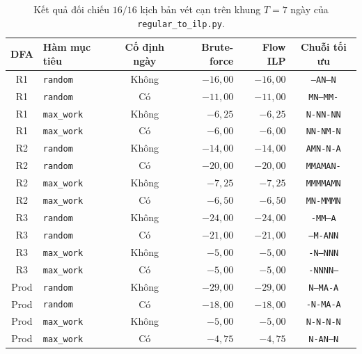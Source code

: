\begin{table}[htbp]
\centering
\caption{Kết quả đối chiếu $16/16$ kịch bản vét cạn trên khung $T=7$ ngày của \texttt{regular\_to\_ilp.py}.}
\label{tab:app_bf}
\footnotesize
\setlength{\tabcolsep}{6pt}
\renewcommand{\arraystretch}{1.16}
\begin{tabularx}{\textwidth}{@{} c L c r r c @{}}
\toprule
\textbf{DFA} & \textbf{Hàm mục tiêu} & \textbf{Cố định ngày} & \textbf{Brute-force} & \textbf{Flow ILP} & \textbf{Chuỗi tối ưu} \\
\midrule
R1 & \texttt{random}    & Không & $-16{,}00$ & $-16{,}00$ & \texttt{--AN--N} \\
R1 & \texttt{random}    & Có    & $-11{,}00$ & $-11{,}00$ & \texttt{MN--MM-} \\
R1 & \texttt{max\_work} & Không & $-6{,}25$  & $-6{,}25$  & \texttt{N-NN-NN} \\
R1 & \texttt{max\_work} & Có    & $-6{,}00$  & $-6{,}00$  & \texttt{NN-NM-N} \\
\addlinespace[3pt]
R2 & \texttt{random}    & Không & $-14{,}00$ & $-14{,}00$ & \texttt{AMN-N-A} \\
R2 & \texttt{random}    & Có    & $-20{,}00$ & $-20{,}00$ & \texttt{MMAMAN-} \\
R2 & \texttt{max\_work} & Không & $-7{,}25$  & $-7{,}25$  & \texttt{MMMMAMN} \\
R2 & \texttt{max\_work} & Có    & $-6{,}50$  & $-6{,}50$  & \texttt{MN-MMMN} \\
\addlinespace[3pt]
R3 & \texttt{random}    & Không & $-24{,}00$ & $-24{,}00$ & \texttt{-MM---A} \\
R3 & \texttt{random}    & Có    & $-21{,}00$ & $-21{,}00$ & \texttt{--M-ANN} \\
R3 & \texttt{max\_work} & Không & $-5{,}00$  & $-5{,}00$  & \texttt{-N--NNN} \\
R3 & \texttt{max\_work} & Có    & $-5{,}00$  & $-5{,}00$  & \texttt{-NNNN--} \\
\addlinespace[3pt]
Prod & \texttt{random}    & Không & $-29{,}00$ & $-29{,}00$ & \texttt{N--MA-A} \\
Prod & \texttt{random}    & Có    & $-18{,}00$ & $-18{,}00$ & \texttt{-N-MA-A} \\
Prod & \texttt{max\_work} & Không & $-5{,}00$  & $-5{,}00$  & \texttt{N-N-N-N} \\
Prod & \texttt{max\_work} & Có    & $-4{,}75$  & $-4{,}75$  & \texttt{N-AN--N} \\
\bottomrule
\end{tabularx}
\end{table}

